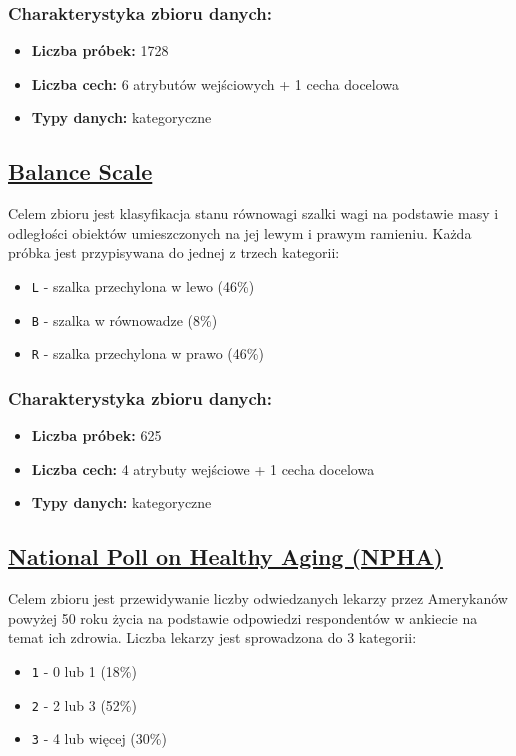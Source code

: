 \documentclass{article}
\begin{document}
\subsubsection*{Charakterystyka zbioru danych:}
\begin{itemize}
    \item \textbf{Liczba próbek:} 1728
    \item \textbf{Liczba cech:} 6 atrybutów wejściowych + 1 cecha docelowa
    \item \textbf{Typy danych:} kategoryczne
\end{itemize}

\subsection{\href{https://archive.ics.uci.edu/dataset/12/balance+scale}{Balance Scale}}

Celem zbioru jest klasyfikacja stanu równowagi szalki wagi na podstawie masy i odległości obiektów umieszczonych na jej lewym i prawym ramieniu. Każda próbka jest przypisywana do jednej z trzech kategorii:
\begin{itemize}
    \item \texttt{L} - szalka przechylona w lewo (46\%)
    \item \texttt{B} - szalka w równowadze (8\%)
    \item \texttt{R} - szalka przechylona w prawo (46\%)
\end{itemize}

\subsubsection*{Charakterystyka zbioru danych:}

\begin{itemize}
    \item \textbf{Liczba próbek:} 625
    \item \textbf{Liczba cech:} 4 atrybuty wejściowe + 1 cecha docelowa
    \item \textbf{Typy danych:} kategoryczne
\end{itemize}

\subsection{\href{https://archive.ics.uci.edu/dataset/936/national+poll+on+healthy+aging+(npha)}{National Poll on Healthy Aging (NPHA)}}

Celem zbioru jest przewidywanie liczby odwiedzanych lekarzy przez Amerykanów powyżej 50 roku życia na podstawie odpowiedzi respondentów w ankiecie na temat ich zdrowia. Liczba lekarzy jest sprowadzona do 3 kategorii:
\begin{itemize}
    \item \texttt{1} - 0 lub 1 (18\%)
    \item \texttt{2} - 2 lub 3 (52\%)
    \item \texttt{3} - 4 lub więcej (30\%)
\end{itemize}
\end{document}
